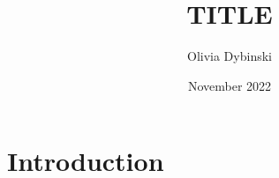 \documentclass[12pt]{article}
\title{TITLE}
\author{Olivia Dybinski\\}
\date{November 2022}
\begin{document}
 \maketitle


 \section{Introduction} 
 \label{sec:intro}







 
 {}
\end{document}
